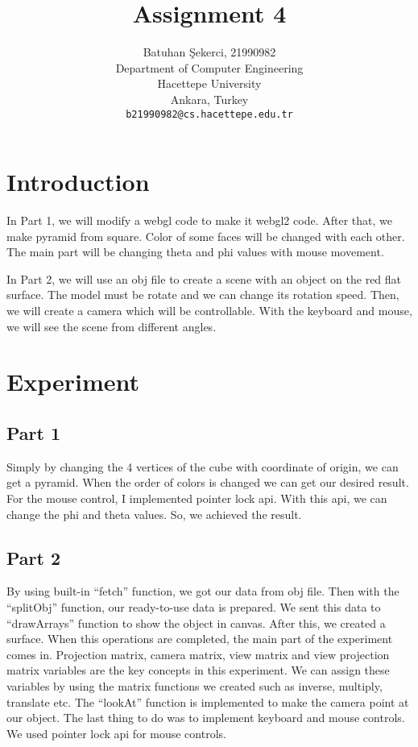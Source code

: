 \documentclass{article}
\title{Assignment 4}
\author{  
  Batuhan Şekerci, 21990982\\
  Department of Computer Engineering\\
  Hacettepe University\\
  Ankara, Turkey \\
  \texttt{b21990982@cs.hacettepe.edu.tr}
}
\begin{document}
\maketitle

\section{Introduction}
In Part 1, we will modify a webgl code to make it webgl2 code. After that, we make pyramid from square. Color of some faces will be changed with each other. The main part will be changing theta and phi values with mouse movement.

In Part 2, we will use an obj file to create a scene with an object on the red flat surface. The model must be rotate and we can change its rotation speed. Then, we will create a camera which will be controllable. With the keyboard and mouse, we will see the scene from different angles.

\section{Experiment}

\subsection{Part 1}
Simply by changing the 4 vertices of the cube with coordinate of origin, we can get a pyramid. When the order of colors is changed we can get our desired result. For the mouse control, I implemented pointer lock api. With this api, we can change the phi and theta values. So, we achieved the result.
\subsection{Part 2}
By using built-in “fetch” function, we got our data from obj file. Then with the “splitObj” function, our ready-to-use data is prepared. We sent this data to “drawArrays” function to show the object in canvas. After this, we created a surface. When this operations are completed, the main part of the experiment comes in. Projection matrix, camera matrix, view matrix and view projection matrix variables are the key concepts in this experiment. We can assign these variables by using the matrix functions we created such as inverse, multiply, translate etc. The “lookAt” function is implemented to make the camera point at our object. The last thing to do was to implement keyboard and mouse controls. We used pointer lock api for mouse controls.
\end{document}
